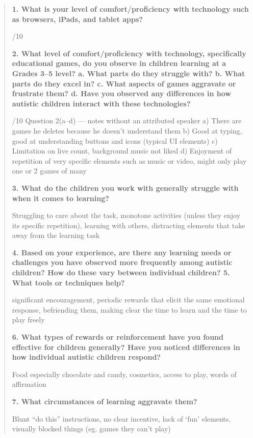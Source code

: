 \documentclass[12pt, titlepage]{article}
\begin{document}
\begin{quote}
\sffamily
\noindent\textbf{1. What is your level of comfort/proficiency with technology such as browsers, iPads, and tablet apps?}

/10

\noindent\textbf{2. What level of comfort/proficiency with technology, specifically educational games, do you observe in children learning at a Grades 3–5 level? a. What parts do they struggle with? b. What parts do they excel in? c. What aspects of games aggravate or frustrate them? d. Have you observed any differences in how autistic children interact with these technologies?}

/10 Question 2(a–d) — notes without an attributed speaker a) There are games he deletes because he doesn’t understand them b) Good at typing, good at understanding buttons and icons (typical UI elements) c) Limitation on live count, background music not liked d) Enjoyment of repetition of very specific elements such as music or video, might only play one or 2 games of many

\noindent\textbf{3. What do the children you work with generally struggle with when it comes to learning?}

\noindent Struggling to care about the task, monotone activities (unless they enjoy its specific repetition), learning with others, distracting elements that take away from the learning task

\noindent\textbf{4. Based on your experience, are there any learning needs or challenges you have observed more frequently among autistic children? How do these vary between individual children? 5. What tools or techniques help?}

\noindent significant encouragement, periodic rewards that elicit the same emotional response, befriending them, making clear the time to learn and the time to play freely

\noindent\textbf{6. What types of rewards or reinforcement have you found effective for children generally? Have you noticed differences in how individual autistic children respond?}

\noindent Food especially chocolate and candy, cosmetics, access to play, words of affirmation

\noindent\textbf{7. What circumstances of learning aggravate them?}

\noindent Blunt “do this” instructions, no clear incentive, lack of ‘fun’ elements, visually blocked things (eg. games they can’t play)


\end{quote}
\end{document}
